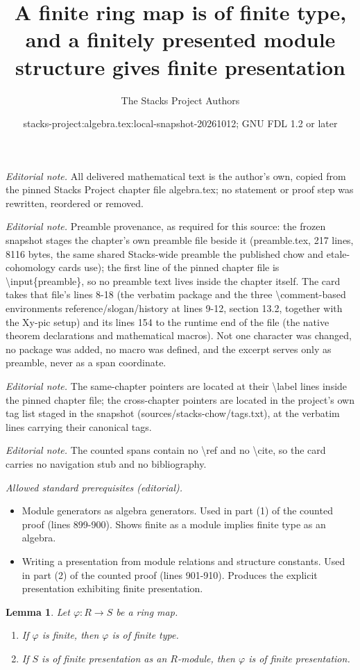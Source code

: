 \documentclass[10pt,a4paper]{amsart}
\title{A finite ring map is of finite type, and a finitely presented module structure gives finite presentation}
\author{The Stacks Project Authors}
\date{stacks-project:algebra.tex:local-snapshot-20261012; GNU FDL 1.2 or later}
\theoremstyle{plain}
\newtheorem{lemma}[subsection]{Lemma}
\theoremstyle{definition}
\theoremstyle{remark}
\numberwithin{equation}{subsection}
\begin{document}
\maketitle
\noindent\textit{Editorial note.} All delivered mathematical text is the author's own, copied from the pinned Stacks Project chapter file algebra.tex; no statement or proof step was rewritten, reordered or removed.\par\medskip
\noindent\textit{Editorial note.} Preamble provenance, as required for this source: the frozen snapshot stages the chapter's own preamble file beside it (preamble.tex, 217 lines, 8116 bytes, the same shared Stacks-wide preamble the published chow and etale-cohomology cards use); the first line of the pinned chapter file is \textbackslash{}input\{preamble\}, so no preamble text lives inside the chapter itself. The card takes that file's lines 8-18 (the verbatim package and the three \textbackslash{}comment-based environments reference/slogan/history at lines 9-12, section 13.2, together with the Xy-pic setup) and its lines 154 to the runtime end of the file (the native theorem declarations and mathematical macros). Not one character was changed, no package was added, no macro was defined, and the excerpt serves only as preamble, never as a span coordinate.\par\medskip
\noindent\textit{Editorial note.} The same-chapter pointers are located at their \textbackslash{}label lines inside the pinned chapter file; the cross-chapter pointers are located in the project's own tag list staged in the snapshot (sources/stacks-chow/tags.txt), at the verbatim lines carrying their canonical tags.\par\medskip
\noindent\textit{Editorial note.} The counted spans contain no \textbackslash{}ref and no \textbackslash{}cite, so the card carries no navigation stub and no bibliography.\par\medskip
\noindent\textit{Allowed standard prerequisites (editorial).}\begin{itemize}
\item Module generators as algebra generators. Used in part (1) of the counted proof (lines 899-900). Shows finite as a module implies finite type as an algebra.
\item Writing a presentation from module relations and structure constants. Used in part (2) of the counted proof (lines 901-910). Produces the explicit presentation exhibiting finite presentation.
\end{itemize}\medskip
\begin{lemma}
\label{lemma-finite-finite-type}
Let $\varphi : R \to S$ be a ring map.
\begin{enumerate}
\item If $\varphi$ is finite, then $\varphi$ is of finite type.
\item If $S$ is of finite presentation as an $R$-module, then
$\varphi$ is of finite presentation.
\end{enumerate}
\end{lemma}
\end{document}
